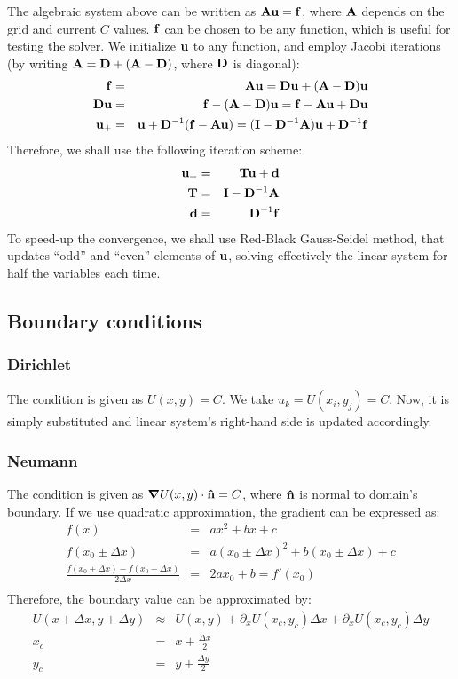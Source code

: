 \documentclass[11pt]{article}
\begin{document}
The algebraic system above can be written as $\mathbf{A} \mathbf{u} = \mathbf{f}$,
where $\mathbf{A}$ depends on the grid and current $C$ values.
$\mathbf{f}$ can be chosen to be any function, which is useful for testing the solver.
We initialize $\mathbf{u}$ to any function, and employ Jacobi iterations
(by writing $\mathbf{A} = \mathbf{D} + (\mathbf{A-D})$, where $\mathbf{D}$ is diagonal):
\begin{eqnarray}
\mathbf{f} &=& \mathbf{A}\mathbf{u} = \mathbf{D}\mathbf{u} + (\mathbf{A-D})\mathbf{u} \\
\mathbf{D}\mathbf{u} &=& \mathbf{f} - (\mathbf{A-D})\mathbf{u} =
\mathbf{f} - \mathbf{A}\mathbf{u} + \mathbf{D}\mathbf{u} \\
\mathbf{u}_+ &=& \mathbf{u} + \mathbf{D}^{-1}(\mathbf{f} - \mathbf{A}\mathbf{u}) =
(\mathbf{I} - \mathbf{D}^{-1}\mathbf{A}) \mathbf{u} + \mathbf{D}^{-1}\mathbf{f} \\
\end{eqnarray}
Therefore, we shall use the following iteration scheme:
\begin{eqnarray}
\mathbf{u}_+ &=& \mathbf{T}\mathbf{u} + \mathbf{d} \\
\mathbf{T} &=& \mathbf{I} - \mathbf{D}^{-1}\mathbf{A} \\
\mathbf{d} &=& \mathbf{D}^{-1}\mathbf{f}
\end{eqnarray}
To speed-up the convergence, we shall use Red-Black Gauss-Seidel method,
that updates ``odd'' and ``even'' elements of $\mathbf{u}$, solving
effectively the linear system for half the variables each time.
\subsection{Boundary conditions}
\subsubsection{Dirichlet}
The condition is given as $U(x, y) = C$.
We take $u_k = U(x_i, y_j) = C$.
Now, it is simply substituted and
linear system's right-hand side is updated accordingly.

\subsubsection{Neumann}
The condition is given as $\boldsymbol{\nabla} U(x,y) \cdot \mathbf{\hat n} = C$,
where $\mathbf{\hat n}$ is normal to domain's boundary.
If we use quadratic approximation, the gradient can be expressed as:
\begin{eqnarray}
  f(x) &=& ax^2 + bx + c \\
  f(x_0 \pm \Delta x) &=&
   a(x_0 \pm \Delta x)^2 + b(x_0 \pm \Delta x) + c \\
  \frac{f(x_0 + \Delta x) - f(x_0 - \Delta x)}{2\Delta x} &=&
   2a x_0 + b = f'(x_0) \\
\end{eqnarray}
Therefore, the boundary value can be approximated by:
\begin{eqnarray}
 U(x + \Delta x,y + \Delta y) &\approx& U(x, y) + \partial_x U(x_c,y_c) \Delta x +
 \partial_x U(x_c,y_c) \Delta y \\
 x_c &=& x + \frac{\Delta x}{2} \\
 y_c &=& y + \frac{\Delta y}{2}
\end{eqnarray}
\end{document}
